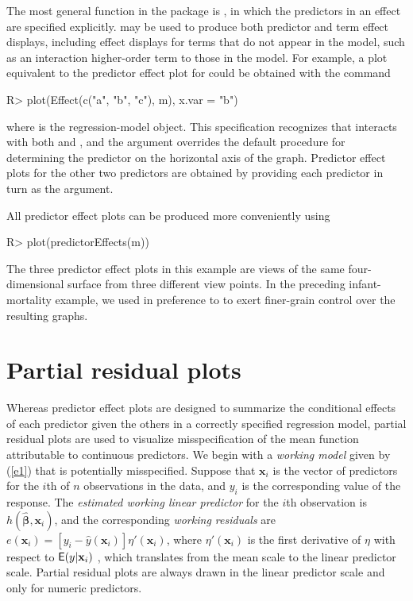 \documentclass[article]{jss}
\newcommand{\x}{\mathbf{x}}
\newcommand{\bbetahat}{\widehat{\boldsymbol{\beta}}}
\begin{document}
The most general function in the  package is
, in which the predictors in an effect are specified
explicitly.  may be used to produce both predictor and
term effect displays, including effect displays for terms that do not
appear in the model, such as an interaction higher-order term to those in
the model. For example, a plot equivalent to the predictor effect plot
for  could be obtained with the command
%
\begin{Schunk}
\begin{Sinput}
R> plot(Effect(c("a", "b", "c"), m), x.var = "b")
\end{Sinput}
\end{Schunk}
%
where  is the regression-model object.  This specification
recognizes that  interacts with both  and ,
and the  argument overrides the default procedure for
determining the predictor on the horizontal axis of the graph.
Predictor effect plots for the other two predictors are obtained by
providing each predictor in turn as the  argument.

All predictor effect plots can be produced more conveniently using
%
\begin{Schunk}
\begin{Sinput}
R> plot(predictorEffects(m))
\end{Sinput}
\end{Schunk}
%
The three predictor effect plots in this example are views of the same
four-dimensional surface from three different view points. In the
preceding infant-mortality example, we used  in
preference to  to exert finer-grain control
over the resulting graphs.

\section{Partial residual plots}\label{sec-partial-residual-plots}

Whereas predictor effect plots are designed to summarize the conditional effects of each predictor given the others in a correctly specified regression model, partial residual plots are used to visualize misspecification of the mean function attributable to continuous predictors. We begin with a \emph{working model} given by (\ref{e1}) that is potentially misspecified. Suppose that $\x_i$ is the vector of predictors for the $i$th of $n$ observations in the data, and $y_i$ is the corresponding value of the response.  The \emph{estimated working linear predictor} for the $i$th observation is $h(\bbetahat, \x_i)$, and the corresponding \emph{working residuals} are $e(\x_i) = [y_i - \widehat{y}(\x_i)]\eta'(\x_i)$, where $\eta'(\x_i)$ is the first derivative of $\eta$ with respect to $\E(y|\x_i)$ \citep{CookCroos98}, which translates from the mean scale to the linear predictor scale.  Partial residual plots are always drawn in the linear predictor scale and only for numeric predictors.
\end{document}
